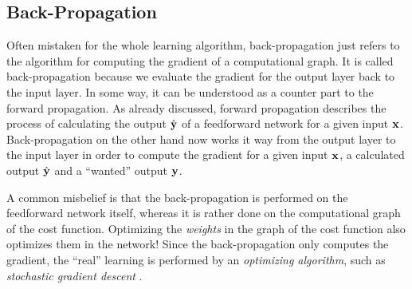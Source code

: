 \subsection{Back-Propagation}
\label{sec:back-propagation}

Often mistaken for the whole learning algorithm, 
back-propagation just refers to the algorithm for computing the gradient of a computational graph.
It is called back-propagation because we evaluate the gradient for the output layer back to the input layer.
In some way, it can be understood as a counter part to the forward propagation.
As already discussed, forward propagation describes the process of calculating the output \(\hat{\mathbf{y}}\) of a feedforward network for a given input \(\mathbf{x}\).
Back-propagation on the other hand now works it way from the output layer to the input layer in order to compute the gradient for a given input \(\mathbf{x}\), a calculated output \(\hat{\mathbf{y}}\) and
a \enquote{wanted} output \(\mathbf{y}\).

A common misbelief is that the back-propagation is performed on the feedforward network itself, whereas it is rather done on the computational graph of the cost function.
Optimizing the \emph{weights} in the graph of the cost function also optimizes them in the network!
Since the back-propagation only computes the gradient, the \enquote{real} learning is performed by an \emph{optimizing algorithm}, such as \emph{stochastic gradient descent} .

